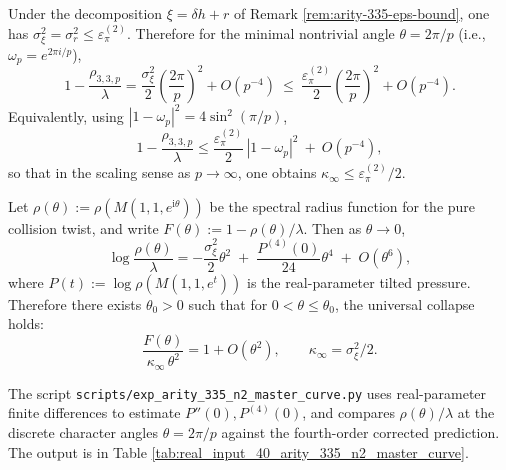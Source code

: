 

\begin{remark}\label{cor:arity-335-eps-trig-bound}
Under the decomposition \(\xi=\delta h+r\) of Remark \ref{rem:arity-335-eps-bound}, one has \(\sigma_\xi^2=\sigma_r^2\le \varepsilon_\pi^{(2)}\).
Therefore for the minimal nontrivial angle \(\theta=2\pi/p\) (i.e., \(\omega_p=e^{2\pi i/p}\)),
$$
1-\frac{\rho_{3,3,p}}{\lambda}
=
\frac{\sigma_\xi^2}{2}\left(\frac{2\pi}{p}\right)^2+O(p^{-4})
\ \le\
\frac{\varepsilon_\pi^{(2)}}{2}\left(\frac{2\pi}{p}\right)^2+O(p^{-4}).
$$
Equivalently, using \(|1-\omega_p|^2=4\sin^2(\pi/p)\),
$$
1-\frac{\rho_{3,3,p}}{\lambda}
\le
\frac{\varepsilon_\pi^{(2)}}{2}\,|1-\omega_p|^2\ +\ O(p^{-4}),
$$
so that in the scaling sense as \(p\to\infty\), one obtains \(\kappa_\infty\le \varepsilon_\pi^{(2)}/2\).
\end{remark}

\begin{remark}\label{prop:arity-335-master-curve}
Let \(\rho(\theta):=\rho(M(1,1,e^{\mathrm{i}\theta}))\) be the spectral radius function for the pure collision twist, and write
\(
F(\theta):=1-\rho(\theta)/\lambda
\).
Then as \(\theta\to 0\),
$$
\log\frac{\rho(\theta)}{\lambda}
=
-\frac{\sigma_\xi^2}{2}\theta^2
\;+\;
\frac{P^{(4)}(0)}{24}\theta^4
\;+\;
O(\theta^6),
$$
where \(P(t):=\log\rho(M(1,1,e^{t}))\) is the real-parameter tilted pressure.
Therefore there exists \(\theta_0>0\) such that for \(0<\theta\le \theta_0\), the universal collapse holds:
$$
\frac{F(\theta)}{\kappa_\infty\,\theta^2}=1+O(\theta^2),
\qquad
\kappa_\infty=\sigma_\xi^2/2.
$$
\end{remark}

\begin{remark}[Reproducible verification: discrete character points \texorpdfstring{$\theta=2\pi/p$}{theta=2pi/p} compared against the master curve]\label{rem:arity-335-master-curve-check}
The script \texttt{scripts/exp\_arity\_335\_n2\_master\_curve.py} uses real-parameter finite differences to estimate \(P''(0),P^{(4)}(0)\), and compares \(\rho(\theta)/\lambda\) at the discrete character angles \(\theta=2\pi/p\) against the fourth-order corrected prediction. The output is in Table \ref{tab:real_input_40_arity_335_n2_master_curve}.
\end{remark}

